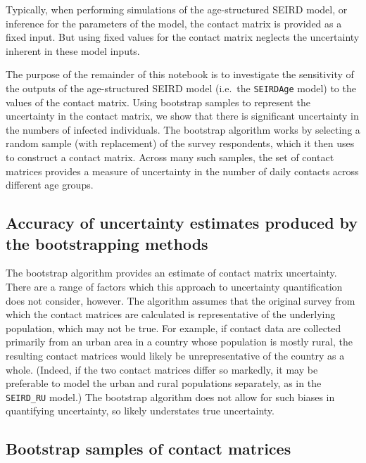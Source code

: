 \documentclass[
]{article}
\begin{document}
Typically, when performing simulations of the age-structured SEIRD
model, or inference for the parameters of the model, the contact matrix
is provided as a fixed input. But using fixed values for the contact
matrix neglects the uncertainty inherent in these model inputs.

The purpose of the remainder of this notebook is to investigate the
sensitivity of the outputs of the age-structured SEIRD model (i.e.~the
\texttt{SEIRDAge} model) to the values of the contact matrix. Using
bootstrap samples to represent the uncertainty in the contact matrix, we
show that there is significant uncertainty in the numbers of infected
individuals. The bootstrap algorithm works by selecting a random sample
(with replacement) of the survey respondents, which it then uses to
construct a contact matrix. Across many such samples, the set of contact
matrices provides a measure of uncertainty in the number of daily
contacts across different age groups.

\hypertarget{accuracy-of-uncertainty-estimates-produced-by-the-bootstrapping-methods}{%
\subsection{Accuracy of uncertainty estimates produced by the
bootstrapping
methods}\label{accuracy-of-uncertainty-estimates-produced-by-the-bootstrapping-methods}}

The bootstrap algorithm provides an estimate of contact matrix
uncertainty. There are a range of factors which this approach to
uncertainty quantification does not consider, however. The algorithm
assumes that the original survey from which the contact matrices are
calculated is representative of the underlying population, which may not
be true. For example, if contact data are collected primarily from an
urban area in a country whose population is mostly rural, the resulting
contact matrices would likely be unrepresentative of the country as a
whole. (Indeed, if the two contact matrices differ so markedly, it may
be preferable to model the urban and rural populations separately, as in
the \texttt{SEIRD\_RU} model.) The bootstrap algorithm does not allow
for such biases in quantifying uncertainty, so likely understates true
uncertainty.

\hypertarget{bootstrap-samples-of-contact-matrices}{%
\subsection{Bootstrap samples of contact
matrices}\label{bootstrap-samples-of-contact-matrices}}
\end{document}
